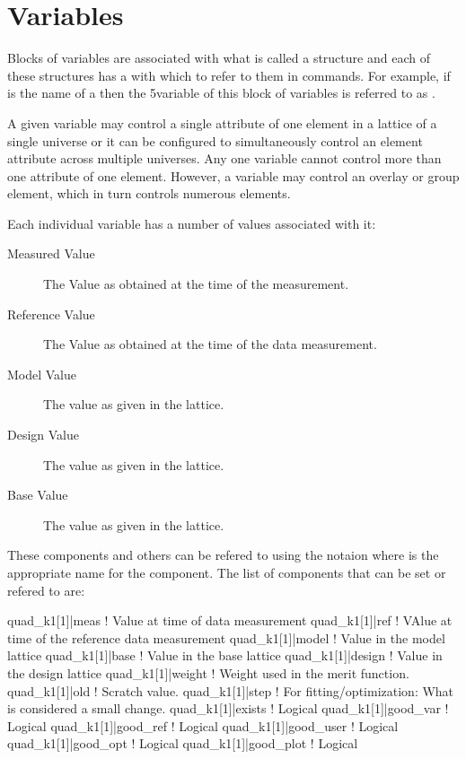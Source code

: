 \section{Variables}

Blocks of variables are associated with what is called a 
structure and each of these structures has a  with which to
refer to them in \tao commands. For example, if  is the
name of a  then the 5\Th variable of this block of
variables is referred to as . 

A given variable may control a single attribute of one element in a
 lattice of a single universe or it can be configured to
simultaneously control an element attribute across multiple
universes. Any one variable cannot control more than one attribute of
one element. However, a variable may control an overlay or group
element, which in turn controls numerous elements.

Each individual variable has a number of values associated with it:
  \vspace*{-3ex}
  \begin{description}
  \item[Measured Value] \Newline
The Value as obtained at the time of the  measurement.
  \item[Reference Value] \Newline
The Value as obtained at the time of the  data  measurement.
  \item[Model Value] \Newline
The value as given in the  lattice.
  \item[Design Value] \Newline
The value as given in the  lattice.
  \item[Base Value] \Newline
The value as given in the  lattice.
  \end{description}
These components and others can be refered to using the notaion  where
 is the appropriate name for the component. The list of
components that can be set or refered to are:
\begin{example}
  quad_k1[1]|meas      ! Value at time of data measurement
  quad_k1[1]|ref       ! VAlue at time of the reference data measurement
  quad_k1[1]|model     ! Value in the model lattice
  quad_k1[1]|base      ! Value in the base lattice
  quad_k1[1]|design    ! Value in  the design lattice
  quad_k1[1]|weight    ! Weight used in the merit function.
  quad_k1[1]|old       ! Scratch value.
  quad_k1[1]|step      ! For fitting/optimization: What is considered a small change.
  quad_k1[1]|exists    ! Logical
  quad_k1[1]|good_var  ! Logical
  quad_k1[1]|good_ref  ! Logical
  quad_k1[1]|good_user ! Logical
  quad_k1[1]|good_opt  ! Logical
  quad_k1[1]|good_plot ! Logical
\end{example}




